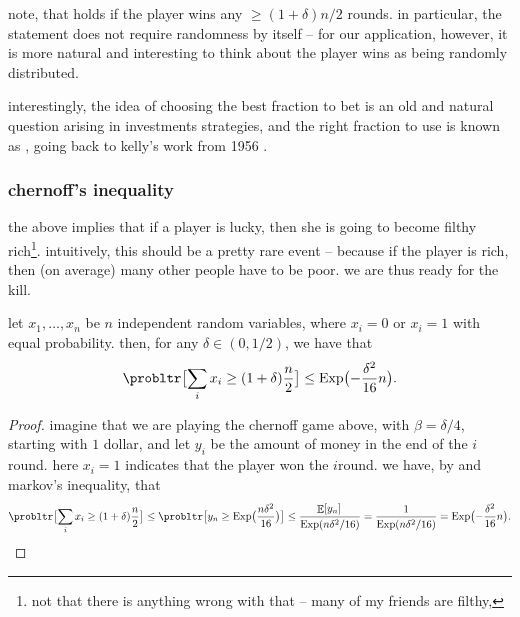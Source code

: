 \begin{remark}
    note, that  holds if the player wins any
    $\geq (1+\delta)n/2$ rounds. in particular, the statement does not
    require randomness by itself -- for our application, however, it
    is more natural and interesting to think about the player wins as
    being randomly distributed.
\end{remark}

\begin{remark}
    interestingly, the idea of choosing the best fraction to bet is an
    old and natural question arising in investments strategies, and
    the right fraction to use is known as
    \href{https://en.wikipedia.org/wiki/kelly_criterion}{}, going back to kelly's work from 1956
    \cite{k-niir-56}.
\end{remark}

\subsubsection{chernoff's inequality}

the above implies that if a player is lucky, then she is going to
become filthy rich\footnote{not that there is anything wrong with that
   -- many of my friends are filthy,}. intuitively, this should be a
pretty rare event -- because if the player is rich, then (on average)
many other people have to be poor. we are thus ready for the kill.

\begin{theorem}
    let $x_1,\ldots, x_n$ be $n$ independent random variables, where
    $x_i=0$ or $x_i=1$ with equal probability. then, for any $\delta
    \in (0,1/2)$, we have that
    \begin{equation*}
        \probltr \bigl[ \sum_i x_i \geq (1+\delta)\frac{n}{2} \bigr]%
        \leq%
        \Exp\bigl( -
        \frac{\delta^2}{ 16} n \bigr).
    \end{equation*}
\end{theorem}
\begin{proof}
    imagine that we are playing the chernoff game above, with
    $\beta=\delta/4$, starting with $1$ dollar, and let $y_i$ be the
    amount of money in the end of the $i$\th round.  here $x_i=1$
    indicates that the player won the $i$\th round.  we have, by
     and markov's inequality, that
    \begin{equation*}
        \probltr \bigl[{ \sum_i x_i \geq (1+\delta)\frac{n}{2}} \bigr]%
        \leq %
        \probltr \bigl[{ y_n \geq \Exp \bigl( {\frac{n \delta^2}{16}}
           \bigr)
        } \bigr] %
        \leq%
        \frac{\Ex{y_n}\bigl. }{\bigl. \Exp\pth{n \delta^2 / 16}}%
        =%
        \frac{1}{\bigl.  \Exp\pth{n \delta^2 / 16}} =
        \Exp \bigl( -\frac{\delta^2}{ 16} n  \bigr).
    \end{equation*}
\end{proof}

